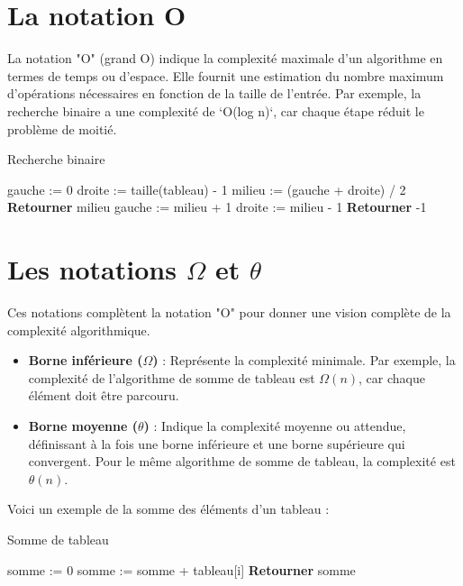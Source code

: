 \section{La notation O}

La notation "O" (grand O) indique la complexité maximale d'un algorithme en termes de temps ou d'espace. Elle fournit une estimation du nombre maximum d'opérations nécessaires en fonction de la taille de l'entrée. Par exemple, la recherche binaire a une complexité de `O(log n)`, car chaque étape réduit le problème de moitié.

\begin{algorithm}
	\caption{Recherche binaire}
	\begin{algorithmic}[1]
		\State gauche := 0
		\State droite := taille(tableau) - 1
		\State milieu := (gauche + droite) / 2
		\State \textbf{Retourner} milieu
		\State gauche := milieu + 1
		\Else
		\State droite := milieu - 1
		\EndIf
		\EndWhile
		\State \textbf{Retourner} -1
		\EndFunction
	\end{algorithmic}
\end{algorithm}

\section{Les notations $\Omega$ et $\theta$}

Ces notations complètent la notation "O" pour donner une vision complète de la complexité algorithmique.

\begin{itemize}
	\item \textbf{Borne inférieure (\(\Omega\))} : Représente la complexité minimale. Par exemple, la complexité de l'algorithme de somme de tableau est $\Omega(n)$, car chaque élément doit être parcouru.
	
	\item \textbf{Borne moyenne (\(\theta\))} : Indique la complexité moyenne ou attendue, définissant à la fois une borne inférieure et une borne supérieure qui convergent. Pour le même algorithme de somme de tableau, la complexité est $\theta(n)$. 
\end{itemize}

Voici un exemple de la somme des éléments d'un tableau :

\begin{algorithm}
	\caption{Somme de tableau}
	\begin{algorithmic}[1]
		\State somme := 0
		\State somme := somme + tableau[i]
		\EndFor
		\State \textbf{Retourner} somme
		\EndFunction
	\end{algorithmic}
\end{algorithm}

